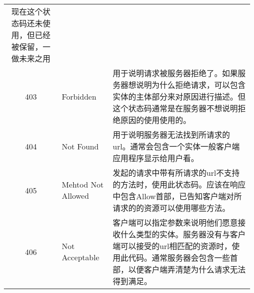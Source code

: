 \begin{longtable}[]{@{}cll@{}}
\begin{minipage}[t]{0.30\columnwidth}
现在这个状态码还未使用，但已经被保留，一做未来之用\strut
\end{minipage}\tabularnewline
\begin{minipage}[t]{0.32\columnwidth}\centering\strut
403\strut
\end{minipage} & \begin{minipage}[t]{0.30\columnwidth}\raggedright\strut
Forbidden\strut
\end{minipage} & \begin{minipage}[t]{0.30\columnwidth}\raggedright\strut
用于说明请求被服务器拒绝了。如果服务器想说明为什么拒绝请求，可以包含实体的主体部分来对原因进行描述。但这个状态码通常是在服务器不想说明拒绝原因的使用使用的。\strut
\end{minipage}\tabularnewline
\begin{minipage}[t]{0.32\columnwidth}\centering\strut
404\strut
\end{minipage} & \begin{minipage}[t]{0.30\columnwidth}\raggedright\strut
Not Found\strut
\end{minipage} & \begin{minipage}[t]{0.30\columnwidth}\raggedright\strut
用于说明服务器无法找到所请求的url。通常会包含一个实体一般客户端应用程序显示给用户看。\strut
\end{minipage}\tabularnewline
\begin{minipage}[t]{0.32\columnwidth}\centering\strut
405\strut
\end{minipage} & \begin{minipage}[t]{0.30\columnwidth}\raggedright\strut
Mehtod Not Allowed\strut
\end{minipage} & \begin{minipage}[t]{0.30\columnwidth}\raggedright\strut
发起的请求中带有所请求的url不支持的方法时，使用此状态码。应该在响应中包含Allow首部，已告知客户端对所请求的的资源可以使用哪些方法。\strut
\end{minipage}\tabularnewline
\begin{minipage}[t]{0.32\columnwidth}\centering\strut
406\strut
\end{minipage} & \begin{minipage}[t]{0.30\columnwidth}\raggedright\strut
Not Acceptable\strut
\end{minipage} & \begin{minipage}[t]{0.30\columnwidth}\raggedright\strut
客户端可以指定参数来说明他们愿意接收什么类型的实体。服务器没有与客户端可以接受的url相匹配的资源时，使用此代码。通常服务器会包含一些首部，以便客户端弄清楚为什么请求无法得到满足。\strut

\end{minipage}
\end{longtable}
